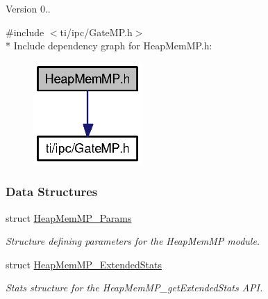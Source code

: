 \begin{DoxyVersion}{Version}
0.. 


\end{DoxyVersion}
{\ttfamily \#include $<$ti/ipc/\-Gate\-M\-P.\-h$>$}\\*
Include dependency graph for Heap\-Mem\-M\-P.\-h\-:
\nopagebreak
\begin{figure}[H]
\begin{center}
\leavevmode
\includegraphics[width=117pt]{_heap_mem_m_p_8h__incl}
\end{center}
\end{figure}
\subsubsection*{Data Structures}
\begin{DoxyCompactItemize}
\item 
struct \hyperlink{struct_heap_mem_m_p___params}{Heap\-Mem\-M\-P\-\_\-\-Params}
\begin{DoxyCompactList}\small\item\em Structure defining parameters for the Heap\-Mem\-M\-P module. \end{DoxyCompactList}\item 
struct \hyperlink{struct_heap_mem_m_p___extended_stats}{Heap\-Mem\-M\-P\-\_\-\-Extended\-Stats}
\begin{DoxyCompactList}\small\item\em Stats structure for the Heap\-Mem\-M\-P\-\_\-get\-Extended\-Stats A\-P\-I. \end{DoxyCompactList}\end{DoxyCompactItemize}
